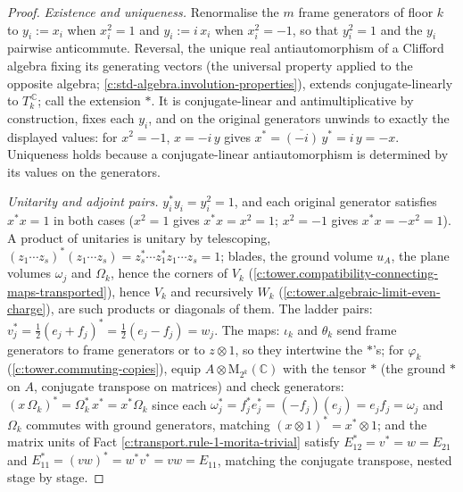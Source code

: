 \documentclass[11pt]{article}
\theoremstyle{definition}
\theoremstyle{plain}
\providecommand{\C}{}\renewcommand{\C}{\mathbb{C}}
\providecommand{\Mat}{}\renewcommand{\Mat}{\mathrm{M}}
\begin{document}
\begin{proof}
\emph{Existence and uniqueness.} Renormalise the $m$ frame generators of floor $k$ to $y_i := x_i$ when $x_i^2 = 1$ and $y_i := i\,x_i$ when $x_i^2 = -1$, so that $y_i^2 = 1$ and the $y_i$ pairwise anticommute. Reversal, the unique real antiautomorphism of a Clifford algebra fixing its generating vectors (the universal property applied to the opposite algebra; \ref{c:std-algebra.involution-properties}), extends conjugate-linearly to $T_k^{\,\C}$; call the extension $*$. It is conjugate-linear and antimultiplicative by construction, fixes each $y_i$, and on the original generators unwinds to exactly the displayed values: for $x^2 = -1$, $x = -i\,y$ gives $x^* = \overline{(-i)}\, y^* = i\,y = -x$. Uniqueness holds because a conjugate-linear antiautomorphism is determined by its values on the generators.

\emph{Unitarity and adjoint pairs.} $y_i^* y_i = y_i^2 = 1$, and each original generator satisfies $x^* x = 1$ in both cases ($x^2 = 1$ gives $x^*x = x^2 = 1$; $x^2 = -1$ gives $x^*x = -x^2 = 1$). A product of unitaries is unitary by telescoping, $(z_1 \cdots z_s)^* (z_1 \cdots z_s) = z_s^* \cdots z_1^* z_1 \cdots z_s = 1$; blades, the ground volume $u_A$, the plane volumes $\omega_j$ and $\Omega_k$, hence the corners of $V_k$ (\ref{c:tower.compatibility-connecting-maps-transported}), hence $V_k$ and recursively $W_k$ (\ref{c:tower.algebraic-limit-even-charge}), are such products or diagonals of them. The ladder pairs: $v_j^* = \tfrac12(e_j + f_j)^* = \tfrac12(e_j - f_j) = w_j$. The maps: $\iota_k$ and $\theta_k$ send frame generators to frame generators or to $z \otimes 1$, so they intertwine the $*$'s; for $\varphi_k$ (\ref{c:tower.commuting-copies}), equip $A \otimes \Mat_{2^k}(\C)$ with the tensor $*$ (the ground $*$ on $A$, conjugate transpose on matrices) and check generators: $(x\,\Omega_k)^* = \Omega_k^*\, x^* = x^* \Omega_k$ since each $\omega_j^* = f_j^* e_j^* = (-f_j)(e_j) = e_j f_j = \omega_j$ and $\Omega_k$ commutes with ground generators, matching $(x \otimes 1)^* = x^* \otimes 1$; and the matrix units of Fact \ref{c:transport.rule-1-morita-trivial} satisfy $E_{12}^* = v^* = w = E_{21}$ and $E_{11}^* = (vw)^* = w^* v^* = vw = E_{11}$, matching the conjugate transpose, nested stage by stage.


\end{proof}
\end{document}
